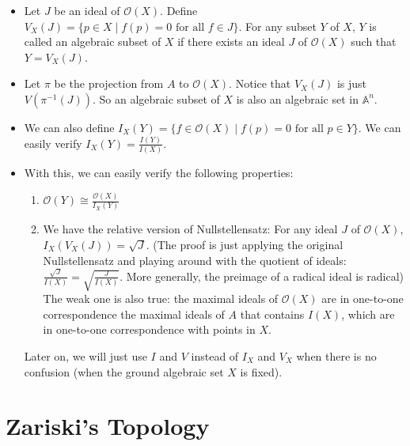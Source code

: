 \documentclass[15pt]{scrartcl}
\newcommand{\A}{\mathbb{A}}
\begin{document}
\begin{itemize}
\subsection{Algebraic Subset of $X$}
    \item Let $J$ be an ideal of $\mathcal{O}(X)$. Define $V_X(J)=\{p\in X\mid f(p)=0 \text{ for all } f \in J\}$. For any subset $Y$ of $X$, $Y$ is called an algebraic subset of $X$ if there exists an ideal $J$ of $\mathcal{O}(X)$ such that $Y=V_X(J)$.
    \item Let $\pi$ be the projection from $A$ to $\mathcal{O}(X)$. Notice that $V_X(J)$ is just $V(\pi^{-1}(J))$. So an algebraic subset of $X$ is also an algebraic set in $\A^n$.  
    \item We can also define $I_X(Y)=\{f\in \mathcal{O}(X)\mid f(p)=0 \text{ for all } p \in Y\}$. We can easily verify  $I_X(Y)=\frac{I(Y)}{I(X)}$.
    \item With this, we can easily verify the following properties:
    \begin{enumerate}
        \item $\mathcal{O}(Y)\cong \frac{\mathcal{O}(X)}{I_X(Y)}$
        \item We have the relative version of Nullstellensatz: For any ideal $J$ of $\mathcal{O}(X)$, $I_X(V_X(J))=\sqrt{J}$. (The proof is just applying the original Nullstellensatz and playing around with the quotient of ideals: $\frac{\sqrt{J}}{I(X)}=\sqrt{\frac{J}{I(X)}}$. More generally, the preimage of a radical ideal is radical) The weak one is also true: the maximal ideals of $\mathcal{O}(X)$ are in one-to-one correspondence the maximal ideals of $A$ that contains $I(X)$, which are in one-to-one correspondence with points in $X$.
    \end{enumerate}
    \begin{remark}
        Later on, we will just use $I$ and $V$ instead of $I_X$ and $V_X$ when there is no confusion (when the ground algebraic set $X$ is fixed).
    \end{remark}
\end{itemize}
\newpage
\section{Zariski's Topology}
\end{document}
